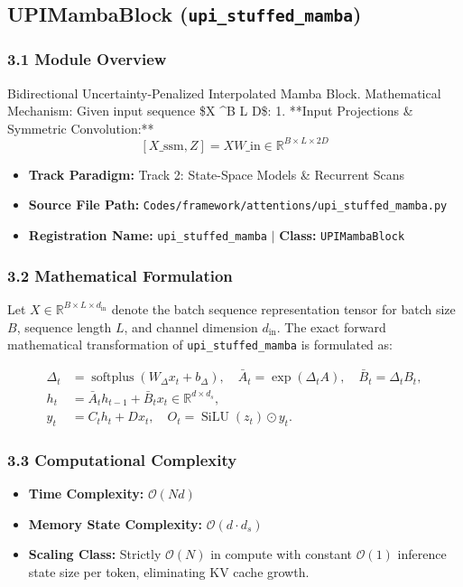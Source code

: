 \subsection{UPIMambaBlock (\texttt{upi\_stuffed\_mamba})}
\label{sec:app_module_upi_stuffed_mamba}

\subsubsection*{3.1 Module Overview}
Bidirectional Uncertainty-Penalized Interpolated Mamba Block.  Mathematical Mechanism:     Given input sequence \$X \in {}^{B \times L \times D}\$:     1. **Input Projections \& Symmetric Convolution:**        $$[X\_{\text{ssm}}, Z] = X W\_{\text{in}} \in \mathbb{R}^{B \times L \times 2 D}$$
\begin{itemize}
    \item \textbf{Track Paradigm:} Track 2: State-Space Models & Recurrent Scans
    \item \textbf{Source File Path:} \texttt{Codes/framework/attentions/upi\_stuffed\_mamba.py}
    \item \textbf{Registration Name:} \texttt{upi\_stuffed\_mamba} $\mid$ \textbf{Class:} \texttt{UPIMambaBlock}
\end{itemize}

\subsubsection*{3.2 Mathematical Formulation}
Let $X \in \mathbb{R}^{B \times L \times d_{\text{in}}}$ denote the batch sequence representation tensor for batch size $B$, sequence length $L$, and channel dimension $d_{\text{in}}$. The exact forward mathematical transformation of \texttt{upi\_stuffed\_mamba} is formulated as:

\begin{align}
\Delta_t &= \operatorname{softplus}(W_\Delta x_t + b_\Delta), \quad \bar{A}_t = \exp(\Delta_t A), \quad \bar{B}_t = \Delta_t B_t, \\
h_t &= \bar{A}_t h_{t-1} + \bar{B}_t x_t \in \mathbb{R}^{d \times d_s}, \\
y_t &= C_t h_t + D x_t, \quad O_t = \operatorname{SiLU}(z_t) \odot y_t.
\end{align}


\subsubsection*{3.3 Computational Complexity}
\begin{itemize}
    \item \textbf{Time Complexity:} $\mathcal{O}(N d)$
    \item \textbf{Memory State Complexity:} $\mathcal{O}(d \cdot d_s)$
    \item \textbf{Scaling Class:} Strictly $\mathcal{O}(N)$ in compute with constant $\mathcal{O}(1)$ inference state size per token, eliminating KV cache growth.
\end{itemize}

